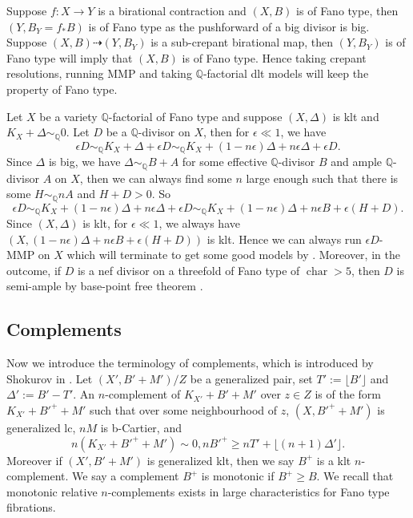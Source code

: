 \documentclass[letterpaper,reqno,12pt]{amsart}
\DeclareMathOperator{\chara}{char}
\numberwithin{equation}{section}
\theoremstyle{plain}
\begin{document}
Suppose $f:X\to Y$ is a birational contraction and $(X,B)$ is of Fano type, then $(Y,B_Y=f_*B)$ is of Fano type as the pushforward of a big divisor is big. Suppose $(X,B)\dashrightarrow(Y,B_Y)$ is a sub-crepant birational map, then $(Y,B_Y)$ is of Fano type will imply that $(X,B)$ is of Fano type. Hence taking crepant resolutions, running MMP and taking $\mathbb Q$-factorial dlt models will keep the property of Fano type.

Let $X$ be a variety $\mathbb Q$-factorial of Fano type and suppose $(X,\Delta)$ is klt and $K_X+\Delta\sim_{\mathbb Q}0$. Let $D$ be a $\mathbb Q$-divisor on $X$, then for $\epsilon\ll 1$, we have \[\epsilon D\sim_{\mathbb Q} K_X+\Delta+\epsilon D\sim_{\mathbb Q}K_X+(1-n\epsilon)\Delta +n\epsilon \Delta+\epsilon D.\] Since $\Delta$ is big, we have $\Delta\sim_{\mathbb Q} B+A$ for some effective $\mathbb Q$-divisor $B$ and ample $\mathbb Q$-divisor $A$ on $X$, then we can always find some $n$ large enough such that there is some $ H\sim_{\mathbb Q} nA$ and $H+D>0$. So 
\[\epsilon D\sim_{\mathbb Q}K_X+(1-n\epsilon)\Delta +n\epsilon \Delta+\epsilon D\sim_{\mathbb Q}K_X+(1-n\epsilon)\Delta+ n\epsilon B+\epsilon (H+D).\]
Since $(X,\Delta)$ is klt, for $\epsilon\ll 1$, we always have $(X,(1-n\epsilon)\Delta+ n\epsilon B+\epsilon (H+D))$ is klt. Hence we can always run $\epsilon D$-MMP on $X$ which will terminate to get some good models by . Moreover, in the outcome, if $D$ is a nef divisor on a threefold of Fano type of $\chara>5$, then $D$ is semi-ample by base-point free theorem \cite[1.2]{birkar2014existencemorifibrespaces}.

\subsection{Complements}

Now we introduce the terminology of complements, which is introduced by Shokurov in \cite{3foldflip}. Let $(X',B'+M')/Z$ be a generalized pair, set $T':=\lfloor B'\rfloor$ and $\Delta':=B'-T'$. An $n$-complement of $K_{X'}+B'+M'$ over $z\in Z$ is of the form $K_{X'}+B'^++M'$ such that over some neighbourhood of $z$, $(X,B'^++M')$ is generalized lc, $nM$ is b-Cartier, and \[n(K_{X'}+B'^++M')\sim 0,nB'^+\geq nT'+\lfloor (n+1)\Delta'\rfloor.\] Moreover if $(X',B'+M')$ is generalized klt, then we say $B^+$ is a klt $n$-complement. We say a complement $B^+$ is monotonic if $B^+\geq B$. We recall that monotonic relative $n$-complements exists in large characteristics for Fano type fibrations.
\end{document}
